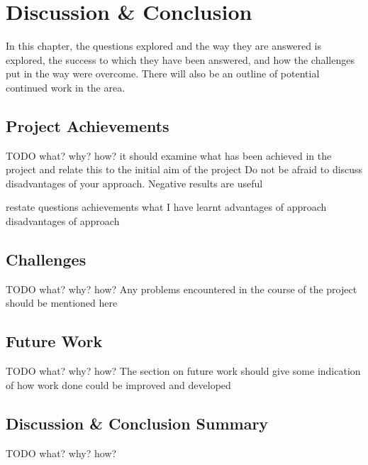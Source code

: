 
\chapter{Discussion \& Conclusion}

In this chapter, the questions explored and the way they are answered is explored, the success to which they have been answered, and how the challenges put in the way were overcome. There will also be an outline of potential continued work in the area.

\section{Project Achievements}

TODO what? why? how?
it should examine what has been achieved in the project and relate this to the initial aim of the project
Do not be afraid to discuss disadvantages of your approach. Negative results are useful

restate questions
achievements
what I have learnt
advantages of approach
disadvantages of approach

\section{Challenges}

TODO what? why? how?
Any problems encountered in the course of the project should be mentioned here

\section{Future Work}

TODO what? why? how?
The section on future work should give some indication of how work done could be improved and developed

\section{Discussion \& Conclusion Summary}

TODO what? why? how?